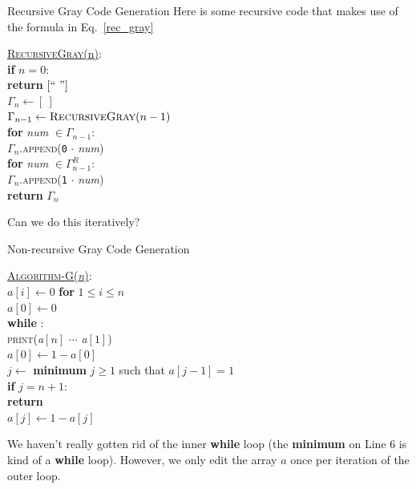 \documentclass[aspectratio=169]{beamer}
\begin{document}
\begin{frame}{Recursive Gray Code Generation}
    Here is some recursive code that makes use of the formula in Eq.~\ref{rec_gray}
    
    \begin{nalgo}
    \underline{\textsc{RecursiveGray}(n)}:
    \\\label{}  \textbf{if} $n = 0$:\+
    \\\label{}      \textbf{return} $[``\ "]$\-
    \\\label{}  $\Gamma_n \gets [~]$
    \\\label{}  $\Gamma_{n - 1} \gets \textsc{RecursiveGray}(n - 1)$
    \\\label{}  \textbf{for} \textit{num} $\in \Gamma_{n - 1}$:\+
    \\\label{}      $\Gamma_n$.\textsc{append}(\texttt{0} $\cdot$ \textit{num})\-
    \\\label{}  \textbf{for} \textit{num} $\in \Gamma_{n - 1}^R$:\+
    \\\label{}      $\Gamma_n$.\textsc{append}(\texttt{1} $\cdot$ \textit{num})\-
    \\\label{}  \textbf{return} $\Gamma_n$
    \end{nalgo} \pause
    
    Can we do this iteratively?
\end{frame}

\begin{frame}{Non-recursive Gray Code Generation}
    \begin{nalgo}
    \underline{\textsc{Algorithm-G}(\emph{n})}:\+
    \\\label{}  $a[i] \gets 0$ \textbf{for} $1 \leq i \leq n$
    \\\label{}  $a[0] \gets 0$ 
    \\\label{}  \textbf{while} \true:\+
    \\\label{}      \textsc{print}(\emph{a}$[n]$ $\cdots$ \emph{a}$[1]$)
    \\\label{}      $a[0] \gets 1 - a[0]$
    \\ \label{}      $j \gets$ \textbf{minimum} $j \geq 1$ such that $a[j - 1] = 1$
    \\\label{}      \textbf{if} $j = n + 1$:\+
    \\\label{}          \textbf{return}\-
    \\\label{}      $a[j] \gets 1 - a[j]$
    \end{nalgo} \pause
    We haven't really gotten rid of the inner \textbf{while} loop (the \textbf{minimum} on Line 6 is kind of a \textbf{while} loop). However, we only edit the array $a$ once per iteration of the outer loop.
\end{frame}
\end{document}
